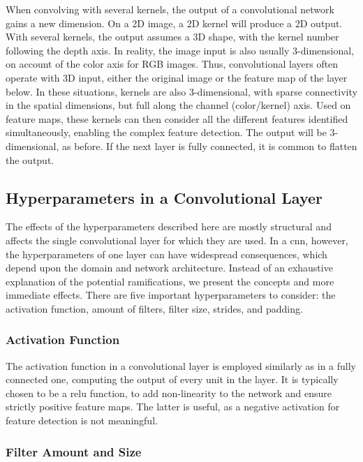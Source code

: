 \noindent When convolving with several kernels, the output of a convolutional network gains a new dimension. On a 2D image, a 2D kernel will produce a 2D output. With several kernels, the output assumes a 3D shape, with the kernel number following the depth axis. In reality, the image input is also usually 3-dimensional, on account of the color axis for RGB images. Thus, convolutional layers often operate with 3D input, either the original image or the feature map of the layer below. In these situations, kernels are also 3-dimensional, with sparse connectivity in the spatial dimensions, but full along the channel (color/kernel) axis. Used on feature maps, these kernels can then consider all the different features identified simultaneously, enabling the complex feature detection. The output will be 3-dimensional, as before. If the next layer is fully connected, it is common to flatten the output.

\subsection{Hyperparameters in a Convolutional Layer}

The effects of the hyperparameters described here are mostly structural and affects the single convolutional layer for which they are used. In a \acrshort{cnn}, however, the hyperparameters of one layer can have widespread consequences, which depend upon the domain and network architecture. Instead of an exhaustive explanation of the potential ramifications, we present the concepts and more immediate effects. There are five important hyperparameters to consider: the activation function, amount of filters, filter size, strides, and padding. 

\subsubsection{Activation Function}

The activation function in a convolutional layer is employed similarly as in a fully connected one, computing the output of every unit in the layer. It is typically chosen to be a \acrshort{relu} function, to add non-linearity to the network and ensure strictly positive feature maps. The latter is useful, as a negative activation for feature detection is not meaningful.

\subsubsection{Filter Amount and Size}

